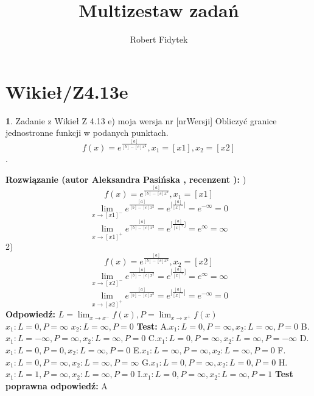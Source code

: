 \documentclass[12pt, a4paper]{article}
\title{Multizestaw zadań}
\author{Robert Fidytek}
\date{}
\theoremstyle{definition} %
\newtheorem{zad}{}
\newcommand{\kategoria}[1]{\section{#1}} %
\newcommand{\zadStart}[1]{\begin{zad}#1\newline} %
\newcommand{\zadStop}{\end{zad}}   %
\newcommand{\rozwStart}[2]{\noindent \textbf{Rozwiązanie (autor #1 , recenzent #2): }\newline} %
\newcommand{\rozwStop}{\newline}                                            %
\newcommand{\odpStart}{\noindent \textbf{Odpowiedź:}\newline}    %
\newcommand{\odpStop}{\newline}                                             %
\newcommand{\testStart}{\noindent \textbf{Test:}\newline} %
\newcommand{\testStop}{\newline} %
\newcommand{\kluczStart}{\noindent \textbf{Test poprawna odpowiedź:}\newline} %
\newcommand{\kluczStop}{\newline} %
\begin{document}
\maketitle


\kategoria{Wikieł/Z4.13e}
\zadStart{Zadanie z Wikieł Z 4.13 e) moja wersja nr [nrWersji]}
Obliczyć granice jednostronne funkcji w podanych punktach. $$f(x)=e^\frac{[a]}{[b]-[c]x^2},x_{1}=[x1],x_{2}=[x2]$$.
\zadStop
\rozwStart{Aleksandra Pasińska}{}
1)$$f(x)=e^\frac{[a]}{[b]-[c]x^2},x_{1}=[x1]$$
$$\lim_{x\rightarrow [x1]^-}e^\frac{[a]}{[b]-[c]x^2}=e^{\biggl[\frac{[a]}{[x]^-}\biggr]}=e^{-\infty}=0$$ 
$$\lim_{x\rightarrow [x1]^+}e^\frac{[a]}{[b]-[c]x^2}=e^{\biggl[\frac{[a]}{[x]^+}\biggr]}=e^{\infty}=\infty$$ 
2)$$f(x)=e^\frac{[a]}{[b]-[c]x^2},x_{2}=[x2]$$
$$\lim_{x\rightarrow [x2]^-}e^\frac{[a]}{[b]-[c]x^2}=e^{\biggl[\frac{[a]}{[x]^+}\biggr]}=e^{\infty}=\infty$$ 
$$\lim_{x\rightarrow [x2]^+}e^\frac{[a]}{[b]-[c]x^2}=e^{\biggl[\frac{[a]}{[x]^-}\biggr]}=e^{-\infty}=0$$ 
\rozwStop
\odpStart
$L=\lim_{x\rightarrow x^-}f(x),P=\lim_{x\rightarrow x^+}f(x)$\\
$x_{1}:L=0, P=\infty$
$x_{2}:L=\infty, P=0$
\odpStop
\testStart
A.$x_{1}:L=0, P=\infty, x_{2}:L=\infty, P=0$
B.$x_{1}:L=-\infty, P=\infty, x_{2}:L=\infty, P=0$
C.$x_{1}:L=0, P=\infty, x_{2}:L=\infty, P=-\infty$
D.$x_{1}:L=0, P=0, x_{2}:L=\infty, P=0$
E.$x_{1}:L=\infty, P=\infty, x_{2}:L=\infty, P=0$
F.$x_{1}:L=0, P=\infty, x_{2}:L=\infty, P=\infty$
G.$x_{1}:L=0, P=\infty, x_{2}:L=0, P=0$
H.$x_{1}:L=1, P=\infty, x_{2}:L=\infty, P=0$
I.$x_{1}:L=0, P=\infty, x_{2}:L=\infty, P=1$
\testStop
\kluczStart
A
\kluczStop
\end{document}
